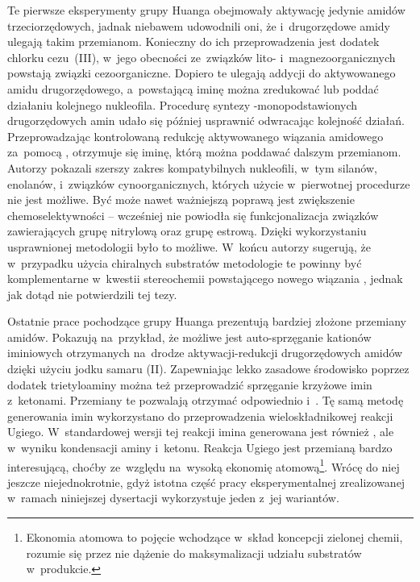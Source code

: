 Te pierwsze eksperymenty grupy Huanga obejmowały aktywację jedynie amidów trzeciorzędowych,
  jadnak niebawem udowodnili oni, że i~drugorzędowe amidy ulegają takim przemianom.
Konieczny do ich przeprowadzenia jest dodatek chlorku cezu~(III), w~jego obecności ze~związków lito- i~magnezoorganicznych
  powstają  związki cezoorganiczne.
Dopiero te ulegają addycji do aktywowanego amidu drugorzędowego,
  a~powstającą iminę można zredukować lub poddać działaniu kolejnego nukleofila\autocite{xiao12}.
Procedurę syntezy \textalpha-monopodstawionych drugorzędowych amin udało się później usprawnić odwracając kolejność działań.
Przeprowadzając kontrolowaną redukcję aktywowanego wiązania amidowego za~pomocą ,
  otrzymuje się iminę, którą można poddawać dalszym przemianom\autocite{huang15joc}.
Autorzy pokazali szerszy zakres kompatybilnych nukleofili, w~tym silanów, enolanów, i~związków cynoorganicznych,
  których użycie w~pierwotnej procedurze nie jest możliwe.
Być może nawet ważniejszą poprawą jest zwiększenie chemoselektywności \--- wcześniej nie powiodła się funkcjonalizacja
  związków zawierających grupę nitrylową oraz grupę estrową.
Dzięki wykorzystaniu usprawnionej metodologii było to możliwe\autocite{huang15joc}.
W~końcu autorzy sugerują, że w~przypadku użycia chiralnych substratów metodologie te powinny być komplementarne
  w~kwestii stereochemii powstającego nowego wiązania , jednak jak dotąd nie potwierdzili tej tezy.

Ostatnie prace pochodzące grupy Huanga prezentują bardziej złożone przemiany amidów.
Pokazują na~przykład, że możliwe jest auto-sprzęganie kationów iminiowych otrzymanych na~drodze aktywacji-redukcji
  drugorzędowych amidów dzięki użyciu jodku samaru (II).
Zapewniając lekko zasadowe środowisko poprzez dodatek trietyloaminy można też przeprowadzić sprzęganie krzyżowe imin z~ketonami.
Przemiany te pozwalają otrzymać odpowiednio  i~\autocite{huang15comm}.
Tę samą metodę generowania imin wykorzystano do przeprowadzenia wieloskładnikowej reakcji Ugiego\autocite{zheng15}.
W~standardowej wersji tej reakcji imina generowana jest również , ale w~wyniku kondensacji aminy i~ketonu.
Reakcja Ugiego jest przemianą bardzo interesującą, choćby ze~względu na~wysoką ekonomię atomową\footnote{%
  Ekonomia atomowa to pojęcie wchodzące w~skład koncepcji zielonej chemii,
  rozumie się przez nie dążenie do maksymalizacji udziału substratów w~produkcie.
}.
Wrócę do niej jeszcze niejednokrotnie, gdyż istotna część pracy eksperymentalnej
  zrealizowanej w~ramach niniejszej dysertacji wykorzystuje jeden z~jej wariantów.

